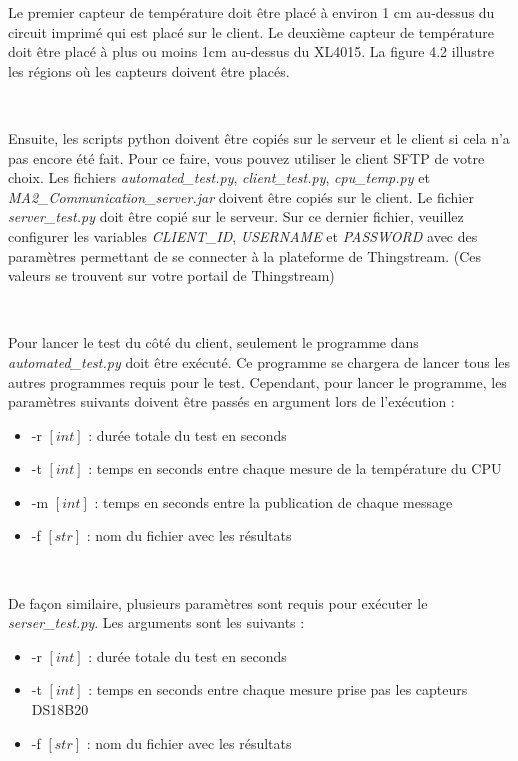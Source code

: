 \noindent
Le premier capteur de température doit être placé à environ 1 cm au-dessus du circuit imprimé qui est placé sur le client. Le deuxième capteur de température doit être placé à plus ou moins 1cm au-dessus du XL4015. La figure 4.2 illustre les régions où les capteurs doivent être placés.

~

\noindent
Ensuite, les scripts python doivent être copiés sur le serveur et le client si cela n’a pas encore été fait. Pour ce faire, vous pouvez utiliser le client SFTP de votre choix. Les fichiers \textit{automated\_test.py}, \textit{client\_test.py}, \textit{cpu\_temp.py} et \textit{MA2\_Communication\_server.jar} doivent être copiés sur le client. Le fichier \textit{server\_test.py} doit être copié sur le serveur. Sur ce dernier fichier, veuillez configurer les variables \textit{CLIENT\_ID}, \textit{USERNAME} et \textit{PASSWORD} avec des paramètres permettant de se connecter à la plateforme de Thingstream. (Ces valeurs se trouvent sur votre portail de Thingstream)

~

\noindent
Pour lancer le test du côté du client, seulement le programme dans \textit{automated\_test.py} doit être exécuté. Ce programme se chargera de lancer tous les autres programmes requis pour le test. Cependant, pour lancer le programme, les paramètres suivants doivent être passés en argument lors de l’exécution :

\begin{itemize}
  \item -r $[int]$ : durée totale du test en seconds
  \item -t $[int]$ : temps en seconds entre chaque mesure de la température du CPU
  \item -m $[int]$ : temps en seconds entre la publication de chaque message
  \item -f $[str]$ : nom du fichier avec les résultats
\end{itemize}

~

\noindent
De façon similaire, plusieurs paramètres sont requis pour exécuter le \textit{serser\_test.py}. Les arguments sont les suivants :

\begin{itemize}
  \item -r $[int]$ : durée totale du test en seconds
  \item -t $[int]$ : temps en seconds entre chaque mesure prise pas les capteurs DS18B20
  \item -f $[str]$ : nom du fichier avec les résultats
\end{itemize}

